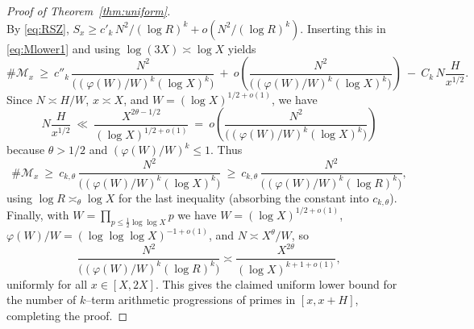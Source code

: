 \documentclass[11pt]{amsart}
\theoremstyle{definition}
\theoremstyle{remark}
\numberwithin{equation}{section}
\begin{document}
\begin{proof}[Proof of Theorem~\ref{thm:uniform}]
\begin{equation}
\end{equation}
By \eqref{eq:RSZ}, $S_x\ge c'_k\,N^2/(\log R)^k+o(N^2/(\log R)^k)$. Inserting this in \eqref{eq:Mlower1} and using $\log(3X)\asymp\log X$ yields
\[
\#\mathcal M_x\ \ge\ c''_{k}\,\frac{N^{2}}{\big((\varphi(W)/W)^{k}(\log X)^{k}\big)}\ +\ o\!\left(\frac{N^{2}}{\big((\varphi(W)/W)^{k}(\log X)^{k}\big)}\right)\ -\ C_k\,N\frac{H}{x^{1/2}}.
\]
Since $N\asymp H/W$, $x\asymp X$, and $W=(\log X)^{1/2+o(1)}$, we have
\[
N\frac{H}{x^{1/2}}\ \ll\ \frac{X^{2\theta-1/2}}{(\log X)^{1/2+o(1)}}\ =\ o\!\left(\frac{N^{2}}{\big((\varphi(W)/W)^{k}(\log X)^{k}\big)}\right)
\]
because $\theta>1/2$ and $(\varphi(W)/W)^{k}\le1$. Thus
\[
\#\mathcal M_x\ \ge\ c_{k,\theta}\,\frac{N^{2}}{\big((\varphi(W)/W)^{k}(\log X)^{k}\big)}\ \ge\ c_{k,\theta}\,\frac{N^{2}}{\big((\varphi(W)/W)^{k}(\log R)^{k}\big)},
\]
using $\log R\asymp_{\theta}\log X$ for the last inequality (absorbing the constant into $c_{k,\theta}$). Finally, with $W=\prod_{p\le \tfrac12\log\log X}p$ we have $W=(\log X)^{1/2+o(1)}$, $\varphi(W)/W=(\log\log\log X)^{-1+o(1)}$, and $N\asymp X^{\theta}/W$, so
\[
\frac{N^{2}}{\big((\varphi(W)/W)^{k}(\log R)^{k}\big)}\asymp \frac{X^{2\theta}}{(\log X)^{k+1+o(1)}},
\]
uniformly for all $x\in[X,2X]$. This gives the claimed uniform lower bound for the number of $k$–term arithmetic progressions of primes in $[x,x+H]$, completing the proof.
\end{proof}
\end{document}
